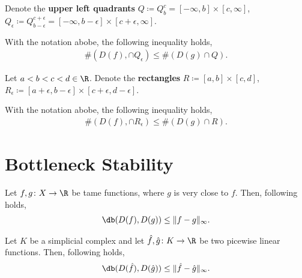 Denote the {\bf upper left quadrants} $ Q \coloneq Q_b^c = [-\infty, b] \times [c, \infty] $, $ Q_\epsilon \coloneq Q_{b-\epsilon}^{c+\epsilon} = [-\infty, b-\epsilon] \times [c+\epsilon, \infty] $.

\begin{lemma} \label{lemma:quadrant-lemma}
    With the notation abobe, the following inequality holds,
    \begin{align}
        \#(D(f), \cap Q_\epsilon) \leq \#(D(g) \cap Q).
    \end{align}
\end{lemma}

Let $ a < b < c < d \in \R $. Denote the {\bf rectangles} $ R \coloneq [a, b] \times [c, d] $, $ R_\epsilon \coloneq [a+\epsilon, b-\epsilon] \times [c+\epsilon, d -\epsilon] $.

\begin{lemma} \label{lemma:box-lemma}
    With the notation abobe, the following inequality holds,
    \begin{align}
        \#(D(f), \cap R_\epsilon) \leq \#(D(g) \cap R).
    \end{align}
\end{lemma}

\section{Bottleneck Stability}

\begin{lemma}
    Let $ f, g \colon X \to \R $ be tame functions, where $ g $ is very close to $ f $. Then, following holds,
    \begin{align}
        \db(D(f), D(g)) \leq \|f - g \|_\infty.
    \end{align}
\end{lemma}

\begin{lemma}
    Let $ K $ be a simplicial complex and let $ \hat f, \hat g \colon K \to \R $ be two picewise linear functions. Then, following holds,
    \begin{align}
        \db(D(\hat f), D(\hat g)) \leq \|\hat f - \hat g \|_\infty.
    \end{align}
\end{lemma}